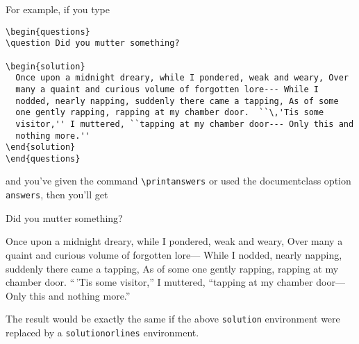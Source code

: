 \documentclass[12pt]{exam}
\begin{document}
\medskip

For example, if you type
\begin{verbatim}
\begin{questions}
\question Did you mutter something?

\begin{solution}
  Once upon a midnight dreary, while I pondered, weak and weary, Over
  many a quaint and curious volume of forgotten lore--- While I
  nodded, nearly napping, suddenly there came a tapping, As of some
  one gently rapping, rapping at my chamber door.  ``\,'Tis some
  visitor,'' I muttered, ``tapping at my chamber door--- Only this and
  nothing more.''
\end{solution}
\end{questions}
\end{verbatim}
and you've given the command \verb"\printanswers" or used the
documentclass option \verb"answers", then you'll get
\bigskip
\begin{questions}
\question Did you mutter something?

\begin{TheSolution}
  Once upon a midnight dreary, while I pondered, weak and weary, Over
  many a quaint and curious volume of forgotten lore--- While I
  nodded, nearly napping, suddenly there came a tapping, As of some
  one gently rapping, rapping at my chamber door.  ``\,'Tis some
  visitor,'' I muttered, ``tapping at my chamber door--- Only this and
  nothing more.''
\end{TheSolution}
\end{questions}
\bigskip

The result would be exactly the same if the above \verb"solution"
environment were replaced by a \verb"solutionorlines" environment.
\end{document}
